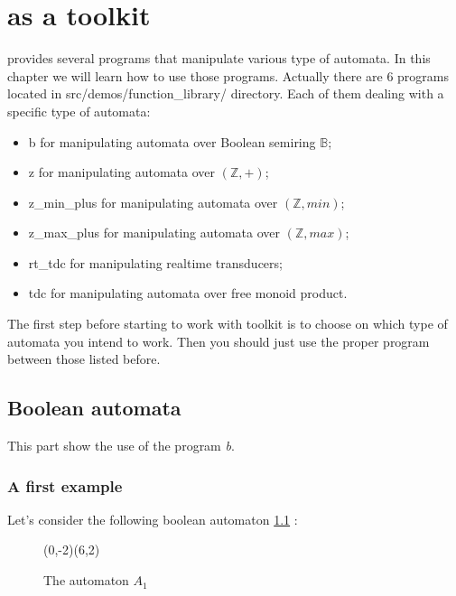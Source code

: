 \chapter{\Vauc as a toolkit}

\Vauc provides several programs that manipulate various type of
automata. In this chapter we will learn
how to use those programs. Actually there are 6 programs
located in src/demos/function\_library/ directory. Each of them
dealing with a specific type of automata:

\begin{itemize}
  \item b for manipulating automata over Boolean semiring $\mathbb{B}$;
  \item z for manipulating automata over $(\mathbb{Z},+)$;
  \item z\_min\_plus for manipulating automata over $(\mathbb{Z},min)$;
  \item z\_max\_plus for manipulating automata over $(\mathbb{Z},max)$;
  \item rt\_tdc for manipulating realtime transducers;
  \item tdc for manipulating automata over free monoid product.
\end{itemize}

The first step before starting to work with \Vauc toolkit is to choose
on which type of automata you intend to work. Then you should just use
the proper program between those listed before.

\section{Boolean automata}

This part show the use of the program \textit{b}.

\subsection{A first example}

Let's consider the following boolean automaton \ref{A_1} :

\begin{figure}[ht] \centering
  \begin{VCPicture}{(0,-2)(6,2)}
      
     
     
       
  \end{VCPicture}
  \caption{The automaton $A_1$}
  \label{A_1}
\end{figure}

